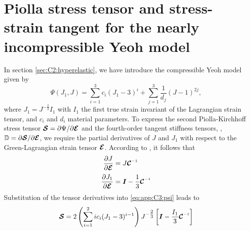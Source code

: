 \section{Piolla stress tensor and stress-strain tangent for the nearly incompressible Yeoh model}
\label{app:C3:yeohmodel}
In section \ref{sec:C2:hyperelastic}, we have introduce the compressible Yeoh model given by 
%
\begin{equation}
\Psi(J_1,J) = \sum_{i = 1}^{3} c_i (J_1 - 3)^i + \sum_{j = 1}^{3} \frac{1}{d_j} (J - 1)^{2j},
\label{eq:app:C3:psi}
\end{equation}
%
where $J_1 = J^{-\tfrac{2}{3}} I_1$ with $I_1$ the first true strain invariant of the Lagrangian strain tensor, and $c_i$ and $d_i$ material parameters. To express the second Piolla-Kirchhoff stress tensor $\boldsymbol{\mathcal{S}} = \partial \Psi/ \partial \boldsymbol{\mathcal{E}}$ and the fourth-order tangent stiffness tensors, \ie, $\mathbb{D} = \partial \boldsymbol{\mathcal{S}}/ \partial \boldsymbol{\mathcal{E}}$, we require the partial derivatives of $J$ and $J_1$ with respect to the Green-Lagrangian strain tensor $\boldsymbol{\mathcal{E}}$. According to \cite{Kim2018,Renaud2011}, it follows that 
%
\begin{align}
\frac{\p J}{\p \ten{E}} & = J \ten{C}\inv \\[0.25em]
\frac{\p J_1}{\p \ten{E}} & = \IB - \frac{1}{3} \ten{C}\inv 
\end{align}
%
Substitution of the tensor derivatives into \eqref{eq:app:C3:psi} leads to 
\begin{equation}
\ten{S} = 2\left(\sum_{i=1}^2 i {c_i} (J_1 - 3)^{i-1} \right) J^{-\tfrac{2}{3}}\left[\IB - \frac{I_1}{3}\CT\inv \right] 
\end{equation}